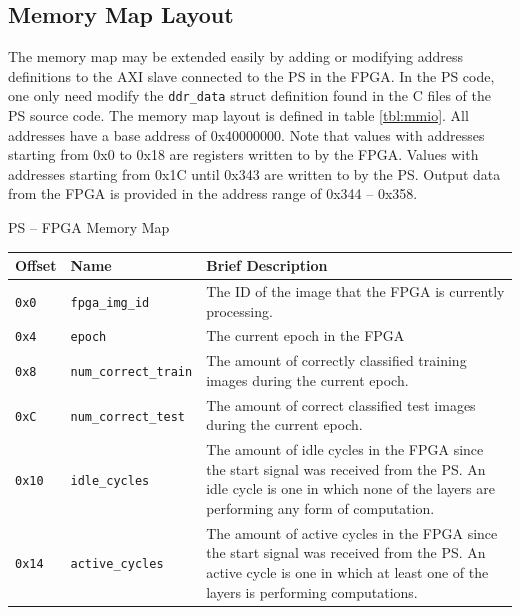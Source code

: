 \subsection{Memory Map Layout}\label{mmio-lay}
The memory map may be extended easily by adding or modifying address definitions to the AXI slave connected to the PS in the FPGA. In the PS code, one only need modify the \texttt{ddr\_data} struct definition found in the C files of the PS source code. The memory map layout is defined in table \ref{tbl:mmio}. All addresses have a base address of 0x40000000. Note that values with addresses starting from 0x0 to 0x18 are registers written to by the FPGA. Values with addresses starting from 0x1C until 0x343 are written to by the PS. Output data from the FPGA is provided in the address range of 0x344 -- 0x358.
\begin{table}
	\centering
	\Large PS -- FPGA Memory Map \\\vspace{0.5em}
	\normalsize
	\begin{tabularx}{\textwidth}{|l| l| X|}
		\hline
		\textbf{Offset}	& \textbf{Name} & \textbf{Brief Description}\\\hline
		
		\texttt{0x0}	& 
		\texttt{fpga\_img\_id} & 
		The ID of the image that the FPGA is currently processing. \\\hline
		
		\texttt{0x4} &
		\texttt{epoch} &
		The current epoch in the FPGA \\\hline
		
		\texttt{0x8} &
		\texttt{num\_correct\_train} &
		The amount of correctly classified training images during the current epoch. \\\hline 
		
		\texttt{0xC} &
		\texttt{num\_correct\_test} &
		The amount of correct classified test images during the current epoch. \\\hline
		
		\texttt{0x10} &
		\texttt{idle\_cycles} &
		The amount of idle cycles in the FPGA since the start signal was received from the PS. An idle cycle is one in which none of the layers are performing any form of computation. \\\hline
		
		\texttt{0x14} &
		\texttt{active\_cycles} &
		The amount of active cycles in the FPGA since the start signal was received from the PS. An active cycle is one in which at least one of the layers is performing computations. \\\hline
		

\end{tabularx}
\end{table}
